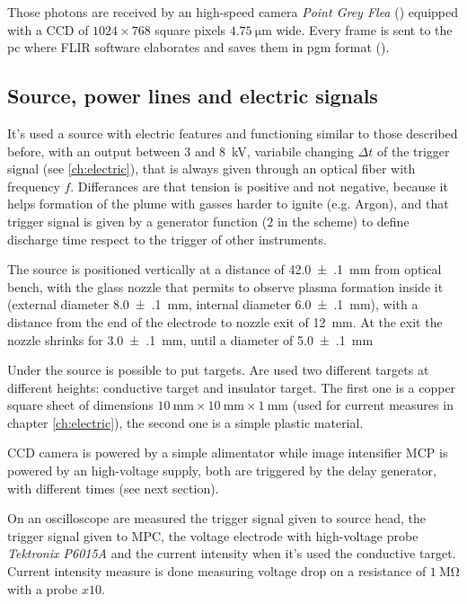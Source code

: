 Those photons are received by an high-speed camera \emph{Point Grey Flea} (\cite{flea}) equipped with a CCD of $\num{1024} \times \num{768}$ square pixels $\SI{4.75}{\micro\meter}$ wide. Every frame is sent to the pc where FLIR software elaborates and saves them in pgm format (\cite{pgm}).

\subsection{Source, power lines and electric signals}
It's used a source with electric features and functioning similar to those described before, with an output between $\num{3}$ and \SI{8}{\kilo\volt}, variabile changing $\Delta t$ of the trigger signal (see \ref{ch:electric}), that is always given through an optical fiber with frequency $f$. Differances are that tension is positive and not negative, because it helps formation of the plume with gasses harder to ignite (e.g. Argon), and that trigger signal is given by a generator function ($2$ in the scheme) to define discharge time respect to the trigger of other instruments.

The source is positioned vertically at a distance of \SI{42.0(1)}{\milli\meter} from optical bench, with the glass nozzle that permits to observe plasma formation inside it (external diameter \SI{8.0(1)}{\milli\meter}, internal diameter \SI{6.0(1)}{\milli\meter}), with a distance from the end of the electrode to nozzle exit of \SI{12}{\milli\meter}. At the exit the nozzle shrinks for \SI{3.0(1)}{\milli\meter}, until a diameter of \SI{5.0(1)}{\milli\meter}

Under the source is possible to put targets. Are used two different targets at different heights: conductive target and insulator target. The first one is a copper square sheet of dimensions $\SI{10}{\milli\meter} \times \SI{10}{\milli\meter} \times \SI{1}{\milli\meter}$ (used for current measures in chapter \ref{ch:electric}), the second one is a simple plastic material.


CCD camera is powered by a simple alimentator while image intensifier MCP is powered by an high-voltage supply, both are triggered by the delay generator, with different times (see next section).


On an oscilloscope are measured the trigger signal given to source head, the trigger signal given to MPC, the voltage electrode with high-voltage probe \emph{Tektronix P6015A} and the current intensity when it's used the conductive target. Current intensity measure is done measuring voltage drop on a resistance of $\SI{1}{\mega\ohm}$ with a probe $x\num{10}$.

